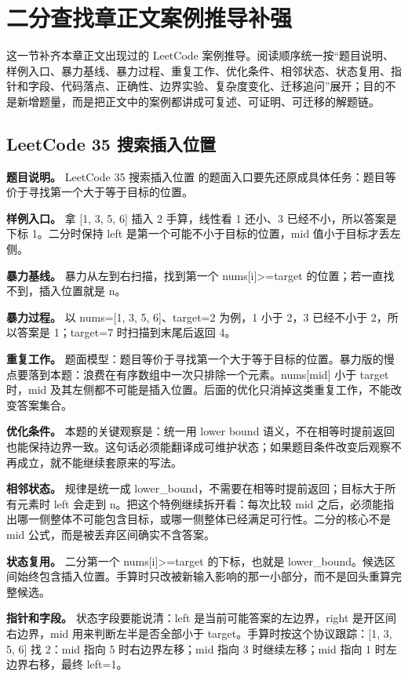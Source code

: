 \section{二分查找章正文案例推导补强}

这一节补齐本章正文出现过的 LeetCode 案例推导。阅读顺序统一按“题目说明、样例入口、暴力基线、暴力过程、重复工作、优化条件、相邻状态、状态复用、指针和字段、代码落点、正确性、边界实验、复杂度变化、迁移追问”展开；目的不是新增题量，而是把正文中的案例都讲成可复述、可证明、可迁移的解题链。

\subsection{LeetCode 35 搜索插入位置}

\textbf{题目说明。} LeetCode 35 搜索插入位置 的题面入口要先还原成具体任务：题目等价于寻找第一个大于等于目标的位置。

\textbf{样例入口。} 拿 [1, 3, 5, 6] 插入 2 手算，线性看 1 还小、3 已经不小，所以答案是下标 1。二分时保持 left 是第一个可能不小于目标的位置，mid 值小于目标才丢左侧。

\textbf{暴力基线。} 暴力从左到右扫描，找到第一个 nums[i]>=target 的位置；若一直找不到，插入位置就是 n。

\textbf{暴力过程。} 以 nums=[1, 3, 5, 6]、target=2 为例，1 小于 2，3 已经不小于 2，所以答案是 1；target=7 时扫描到末尾后返回 4。

\textbf{重复工作。} 题面模型：题目等价于寻找第一个大于等于目标的位置。暴力版的慢点要落到本题：浪费在有序数组中一次只排除一个元素。nums[mid] 小于 target 时，mid 及其左侧都不可能是插入位置。后面的优化只消掉这类重复工作，不能改变答案集合。

\textbf{优化条件。} 本题的关键观察是：统一用 lower bound 语义，不在相等时提前返回也能保持边界一致。这句话必须能翻译成可维护状态；如果题目条件改变后观察不再成立，就不能继续套原来的写法。

\textbf{相邻状态。} 规律是统一成 lower\_bound，不需要在相等时提前返回；目标大于所有元素时 left 会走到 n。把这个特例继续拆开看：每次比较 mid 之后，必须能指出哪一侧整体不可能包含目标，或哪一侧整体已经满足可行性。二分的核心不是 mid 公式，而是被丢弃区间确实不含答案。

\textbf{状态复用。} 二分第一个 nums[i]>=target 的下标，也就是 lower\_bound。候选区间始终包含插入位置。手算时只改被新输入影响的那一小部分，而不是回头重算完整候选。

\textbf{指针和字段。} 状态字段要能说清：left 是当前可能答案的左边界，right 是开区间右边界，mid 用来判断左半是否全部小于 target。手算时按这个协议跟踪：[1, 3, 5, 6] 找 2：mid 指向 5 时右边界左移；mid 指向 3 时继续左移；mid 指向 1 时左边界右移，最终 left=1。

